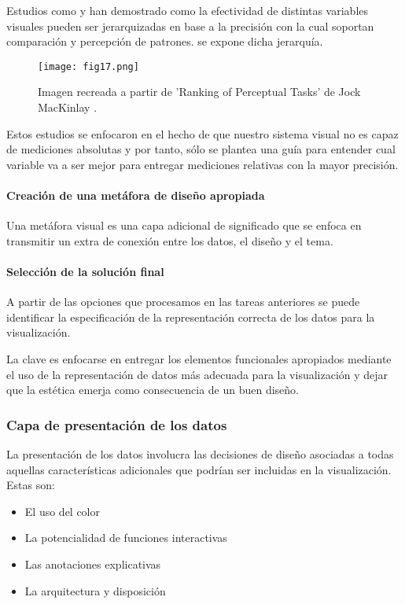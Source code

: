 Estudios como \cite{Cle84} y \cite{Mac86} han demostrado como la efectividad de distintas variables visuales pueden ser jerarquizadas en base a la precisión con la cual soportan comparación y percepción de patrones.  se expone dicha jerarquía.

\begin{figure}[htp]
  \centering
  \texttt{[image: fig17.png]}
  \caption[Ranking de las tareas perceptivas]{Imagen recreada a partir de 'Ranking of Perceptual Tasks' de Jock MacKinlay \cite{Vie04}.}
  \label{fig:fig17}
\end{figure}

Estos estudios se enfocaron en el hecho de que nuestro sistema visual no es capaz de mediciones absolutas y por tanto, sólo se plantea una guía para entender cual variable va a ser mejor para entregar mediciones relativas con la mayor precisión.

\paragraph{Creación de una metáfora de diseño apropiada}
Una metáfora visual es una capa adicional de significado que se enfoca en transmitir un extra de conexión entre los datos, el diseño y el tema.

\paragraph{Selección de la solución final}
A partir de las opciones que procesamos en las tareas anteriores se puede identificar la especificación de la representación correcta de los datos para la visualización.

La clave es enfocarse en entregar los elementos funcionales apropiados mediante el uso de la representación de datos más adecuada para la visualización y dejar que la estética emerja como consecuencia de un buen diseño.

\subsubsection{Capa de presentación de los datos}
La presentación de los datos involucra las decisiones de diseño asociadas a todas aquellas características adicionales que podrían ser incluidas en la visualización. Estas son:

\begin{itemize}
  \item El uso del color
  \item La potencialidad de funciones interactivas
  \item Las anotaciones explicativas
  \item La arquitectura y disposición
\end{itemize}


